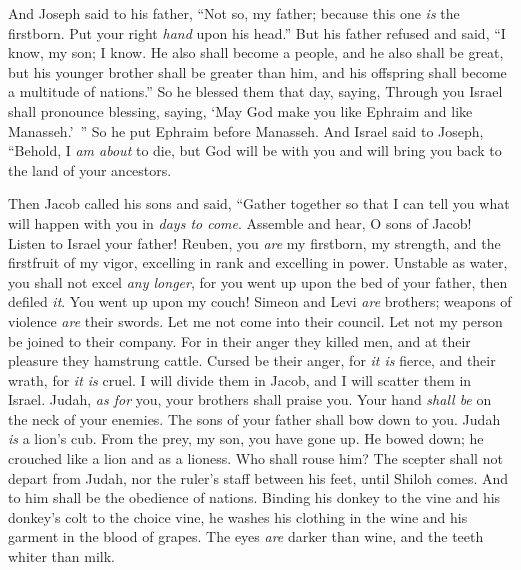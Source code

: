 \begin{biblechapter}
\verse And Joseph said to his father, “Not so, my father; because this one \textit{is} the firstborn. Put your right \textit{hand} upon his head.”
\verse But his father refused and said, “I know, my son; I know. He also shall become a people, and he also shall be great, but his younger brother shall be greater than him, and his offspring shall become a multitude of nations.”
\verse So he blessed them that day, saying, Through you Israel shall pronounce blessing, saying, 
‘May God make you like Ephraim and like Manasseh.’ ”
\verse So he put Ephraim before Manasseh.
\verse And Israel said to Joseph, “Behold, I \textit{am about} to die, but God will be with you and will bring you back to the land of your ancestors.
\end{biblechapter}

\begin{biblechapter} %
 Then Jacob called his sons and said, “Gather together so that I can tell you what will happen with you in \textit{days to come}.
\verse Assemble and hear, O sons of Jacob! 
Listen to Israel your father!
\verse Reuben, you \textit{are} my firstborn, 
my strength, and the firstfruit of my vigor, 
excelling in rank and excelling in power.
\verse Unstable as water, you shall not excel \textit{any longer}, 
for you went up upon the bed of your father, 
then defiled \textit{it}. You went up upon my couch!
\verse Simeon and Levi \textit{are} brothers; 
weapons of violence \textit{are} their swords. 
Let me not come into their council.
\verse Let not my person be joined to their company. 
For in their anger they killed men, 
and at their pleasure they hamstrung cattle.
\verse Cursed be their anger, for \textit{it is} fierce, 
and their wrath, for \textit{it is} cruel. 
I will divide them in Jacob, 
and I will scatter them in Israel.
\verse Judah, \textit{as for} you, your brothers shall praise you. 
Your hand \textit{shall be} on the neck of your enemies. 
The sons of your father shall bow down to you.
\verse Judah \textit{is} a lion’s cub. 
From the prey, my son, you have gone up. 
He bowed down; he crouched like a lion and as a lioness. 
Who shall rouse him?
\verse The scepter shall not depart from Judah, 
nor the ruler’s staff between his feet, 
until Shiloh comes. 
And to him shall be the obedience of nations.
\verse Binding his donkey to the vine 
and his donkey’s colt to the choice vine, 
he washes his clothing in the wine 
and his garment in the blood of grapes.
\verse The eyes \textit{are} darker than wine, 
and the teeth whiter than milk.

\end{biblechapter}

